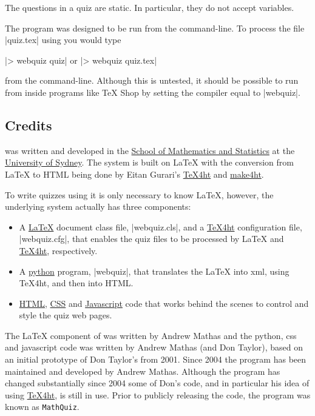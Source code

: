\documentclass[svgnames]{article}
\newcommand\TeXfht{\href{https://www.ctan.org/tex4ht}{TeX4ht}\xspace}
\begin{document}
    The questions in a \WebQuiz quiz are static. In particular, they do
    not accept variables.

    The \WebQuiz program was designed to be run from the command-line.
    To process the file \BashCode|quiz.tex| using \WebQuiz you would
    type

    \BashCode|> webquiz quiz| \qquad or \qquad
    \BashCode|> webquiz quiz.tex|

    \noindent from the command-line. Although this is untested, it
    should be possible to run \WebQuiz from inside programs like \TeX
    Shop by setting the compiler equal to \BashCode|webquiz|.

\subsection{Credits}
    \WebQuiz{} was written and developed in the
    \href{http://www.maths.usyd.edu.au/}{School of Mathematics and
    Statistics} at the \href{http://www.usyd.edu.au/}{University of
    Sydney}.  The system is built on \LaTeX{} with the conversion from
    \LaTeX{} to HTML being done by Eitan Gurari's
    \href{http://www.cis.ohio-state.edu/~gurari/TeXfht/mn.html}{TeX4ht}
    and
    \href{https://github.com/michal-h21/make4ht}{make4ht}.

    To write quizzes using \WebQuiz it is only necessary to know
    \LaTeX, however, the underlying \WebQuiz system actually has three
    components:
    \begin{itemize}
      \item A \href{https://www.latex-project.org/}{\LaTeX} document class
      file, \BashCode|webquiz.cls|, and a \TeXfht
      configuration file, \BashCode|webquiz.cfg|, that enables the
      quiz files to be processed by \LaTeX{} and \TeXfht, respectively.
      \item A \href{https://www.python.org/}{python} program,
      \BashCode|webquiz|, that translates the
      \LaTeX{} into xml, using \TeX 4ht, and then into HTML.
      \item
      \href{https://www.w3schools.com/html/html_intro.asp}{HTML},
      \href{https://www.w3schools.com/css/}{CSS} and
      \href{https://www.w3schools.com/Js/}{Javascript}
      code that works behind the scenes to control and style the quiz
      web pages.
    \end{itemize}

   The \LaTeX{} component of \WebQuiz{} was written by Andrew Mathas
   and the python, css and javascript code was written by Andrew Mathas
   (and Don Taylor), based on an initial prototype of Don Taylor's from
   2001.  Since 2004 the program has been maintained and developed by
   Andrew Mathas. Although the program has changed substantially since
   2004 some of Don's code, and in particular his idea of using
   \TeXfht, is still in use. Prior to publicly releasing the code, the
   program was known as \texttt{MathQuiz}.
\end{document}
